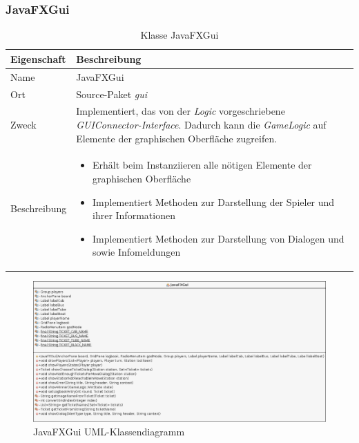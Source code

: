     \subsubsection{JavaFXGui}
        \begin{table}[H]
            \caption{Klasse JavaFXGui}
            \begin{tabular}{p{2.5cm}  p{9.5cm}} 
                \hline
                \textbf{Eigenschaft} & \textbf{Beschreibung}\\
                \hline
                Name & JavaFXGui\\
                Ort & Source-Paket \textit{gui}\\
                \hline
                Zweck &
                Implementiert, das von der \textit{Logic} vorgeschriebene \textit{GUIConnector-Interface}.
                Dadurch kann die \textit{GameLogic} auf Elemente der graphischen Oberfläche zugreifen.
                \\
                \hline
                Beschreibung &
                \begin{itemize}
                    \itemsep0em
                    \item Erhält beim Instanziieren alle nötigen Elemente der graphischen Oberfläche
                    \item Implementiert Methoden zur Darstellung der Spieler und ihrer Informationen
                    \item Implementiert Methoden zur Darstellung von Dialogen und sowie Infomeldungen
                \end{itemize}
                \\
                \hline
            \end{tabular}
        \end{table}
        \begin{figure}[H]
            \centering
            \includegraphics[scale=0.35]{img/uml/javaFXGui.png}   
            \caption{JavaFXGui UML-Klassendiagramm}
        \end{figure}


